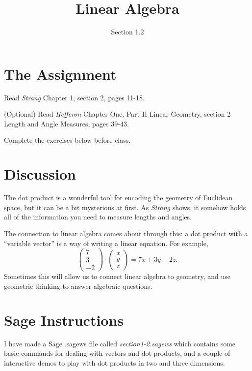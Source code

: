 \documentclass[11pt]{amsart}
\theoremstyle{definition}
\begin{document}
\title{Linear Algebra}
\author{Section 1.2}

\maketitle

\section{The Assignment}
\begin{compactitem}
\item Read \emph{Strang} Chapter 1, section 2, pages 11-18.
\item (Optional) Read \emph{Hefferon} Chapter One, Part II Linear Geometry, section 2 Length and Angle Measures, pages 39-43.
\item Complete the exercises below before class.
\end{compactitem}

\section{Discussion}
The dot product is a wonderful tool for encoding the geometry of Euclidean space, but it can be a bit mysterious at first. As \emph{Strang} shows, it somehow holds all of the information you need to measure lengths and angles.

The connection to linear algebra comes about through this: a dot product with a ``variable vector'' is a way of writing a linear equation. For example,
\begin{equation*}
\begin{pmatrix} 7 \\ 3 \\ -2 \end{pmatrix} \cdot
\begin{pmatrix} x \\ y \\ z \end{pmatrix} = 7x + 3y -2z.
\end{equation*}
Sometimes this will allow us to connect linear algebra to geometry, and use geometric thinking to answer algebraic questions.

\section{Sage Instructions}

I have made a Sage .sagews file called \emph{section1-2.sagews} which contains some basic commands for dealing with vectors and dot products, and a couple of interactive demos to play with dot products in two and three dimensions.
\end{document}
